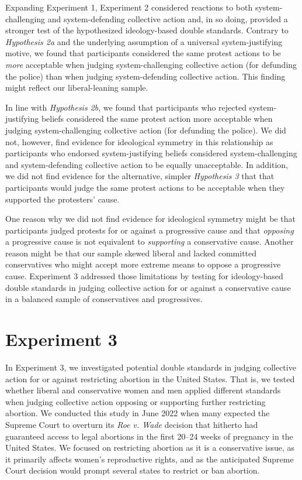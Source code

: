\documentclass[12pt, letterpaper]{article}
\begin{document}
Expanding Experiment 1, Experiment 2 considered reactions to both
system-challenging and system-defending collective action and, in so
doing, provided a stronger test of the hypothesized ideology-based
double standards. Contrary to \emph{Hypothesis 2a} and the underlying
assumption of a universal system-justifying motive, we found that
participants considered the same protest actions to be \emph{more}
acceptable when judging system-challenging collective action (for
defunding the police) than when judging system-defending collective
action. This finding might reflect our liberal-leaning sample.

In line with \emph{Hypothesis 2b}, we found that participants who
rejected system-justifying beliefs considered the same protest action
more acceptable when judging system-challenging collective action (for
defunding the police). We did not, however, find evidence for
ideological symmetry in this relationship as participants who endorsed
system-justifying beliefs considered system-challenging and
system-defending collective action to be equally unacceptable. In
addition, we did not find evidence for the alternative, simpler
\emph{Hypothesis 3} that that participants would judge the same protest
actions to be acceptable when they supported the protesters' cause.

One reason why we did not find evidence for ideological symmetry might
be that participants judged protests for or against a progressive cause
and that \emph{opposing} a progressive cause is not equivalent to
\emph{supporting} a conservative cause. Another reason might be that our
sample skewed liberal and lacked committed conservatives who might
accept more extreme means to oppose a progressive cause. Experiment 3
addressed those limitations by testing for ideology-based double
standards in judging collective action for or against a conservative
cause in a balanced sample of conservatives and progressives.

\hypertarget{experiment-3}{%
\section{Experiment 3}\label{experiment-3}}

In Experiment 3, we investigated potential double standards in judging
collective action for or against restricting abortion in the United
States. That is, we tested whether liberal and conservative women and
men applied different standards when judging collective action opposing
or supporting further restricting abortion. We conducted this study in
June 2022 when many expected the Supreme Court to overturn its \emph{Roe
v. Wade} decision that hitherto had guaranteed access to legal abortions
in the first 20--24 weeks of pregnancy in the United States. We focused
on restricting abortion as it is a conservative issue, as it primarily
affects women's reproductive rights, and as the anticipated Supreme
Court decision would prompt several states to restrict or ban abortion.
\end{document}
